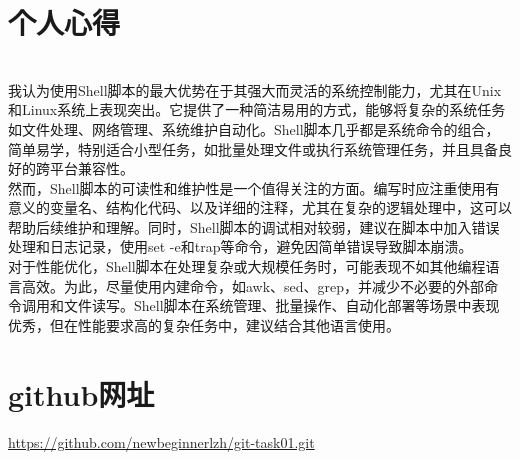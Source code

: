\documentclass[a4paper, 12pt]{article}
\begin{document}
   
\newpage
\section{个人心得}
\\
我认为使用Shell脚本的最大优势在于其强大而灵活的系统控制能力，尤其在Unix和Linux系统上表现突出。它提供了一种简洁易用的方式，能够将复杂的系统任务如文件处理、网络管理、系统维护自动化。Shell脚本几乎都是系统命令的组合，简单易学，特别适合小型任务，如批量处理文件或执行系统管理任务，并且具备良好的跨平台兼容性。
\\
\indent 然而，Shell脚本的可读性和维护性是一个值得关注的方面。编写时应注重使用有意义的变量名、结构化代码、以及详细的注释，尤其在复杂的逻辑处理中，这可以帮助后续维护和理解。同时，Shell脚本的调试相对较弱，建议在脚本中加入错误处理和日志记录，使用set -e和trap等命令，避免因简单错误导致脚本崩溃。
\\
\indent 对于性能优化，Shell脚本在处理复杂或大规模任务时，可能表现不如其他编程语言高效。为此，尽量使用内建命令，如awk、sed、grep，并减少不必要的外部命令调用和文件读写。Shell脚本在系统管理、批量操作、自动化部署等场景中表现优秀，但在性能要求高的复杂任务中，建议结合其他语言使用。
\\

\section{github网址}
\href{https://github.com/newbeginnerlzh/git-task01.git}{\color{red}https://github.com/newbeginnerlzh/git-task01.git}
\end{document}
